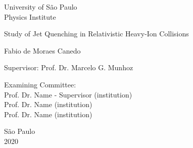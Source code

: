 \pagestyle{empty}
\begin{center}

	{\fontsize{16}{16} \selectfont University of S\~ao Paulo \\}
	\vspace{0.1cm}
	{\fontsize{16}{16} \selectfont Physics Institute}
    \vspace{3.3cm}

	{\fontsize{22}{22}\selectfont Study of Jet Quenching in Relativistic Heavy-Ion Collisions
\par}
    \vspace{1cm}


    {\fontsize{18}{18}\selectfont Fabio de Moraes Canedo\par}

    \vspace{1cm}

\end{center}

\leftskip 6cm
\begin{flushright}	
\leftskip 6cm
Supervisor: Prof. Dr. Marcelo G. Munhoz 
\leftskip 6cm
\end{flushright}	

    \vspace{0.2cm}    


\par
\leftskip 6cm
\par
\leftskip 0cm
\vskip 0.5cm


\noindent Examining Committee: \\
\noindent Prof. Dr. Name - Supervisor (institution)\\
Prof. Dr. Name (institution)\\
Prof. Dr. Name (institution)\\
\vspace{0.5cm}


\centering
    {S\~ao Paulo \\  2020}
\clearpage